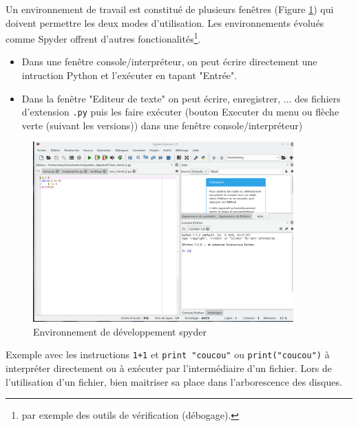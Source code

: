 Un environnement de travail est constitué de plusieurs fenêtres (Figure \ref{fig:spyder}) qui doivent permettre les deux modes d'utilisation. Les environnements évolués comme Spyder offrent d'autres fonctionalités\footnote{par exemple des outils de vérification (débogage).}.
\begin{itemize}
 \item Dans une fenêtre console/interpréteur, on peut écrire directement une intruction Python et l'exécuter en tapant "Entrée". 
 \item Dans la fenêtre "Editeur de texte" on peut écrire, enregistrer, ... des fichiers d'extension \verb|.py| puis les faire exécuter (bouton Executer du menu ou flèche verte (suivant les versions)) dans une fenêtre console/interpréteur)
\end{itemize}
 
 \begin{figure}[h!]
 \centering
 \includegraphics[width=10cm]{environnement_1.png}
 \caption{Environnement de développement spyder}
 \label{fig:spyder}
\end{figure}


Exemple avec les instructions \texttt{1+1} et \texttt{print "coucou"} ou \texttt{print("coucou")} à interpréter directement ou à exécuter par l'intermédiaire d'un fichier. Lors de l'utilisation d'un fichier, bien maitriser sa place dans l'arborescence des disques.

